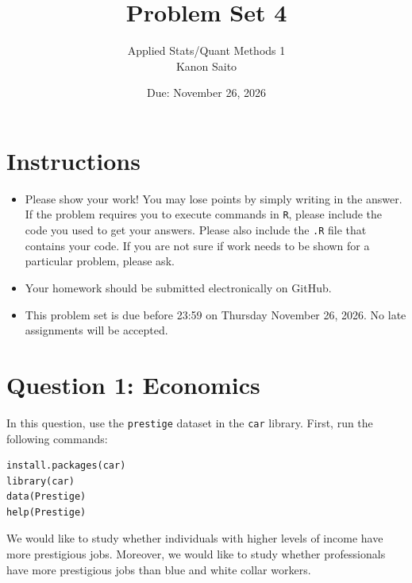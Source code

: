 \documentclass[12pt,letterpaper]{article}
\title{Problem Set 4}
\date{Due: November 26, 2026}
\author{
	Applied Stats/Quant Methods 1\\
	Kanon Saito
}
\begin{document}
	\maketitle
	\section*{Instructions}
	\begin{itemize}
		\item Please show your work! You may lose points by simply writing in the answer. If the problem requires you to execute commands in \texttt{R}, please include the code you used to get your answers. Please also include the \texttt{.R} file that contains your code. If you are not sure if work needs to be shown for a particular problem, please ask.
		\item Your homework should be submitted electronically on GitHub.
		\item This problem set is due before 23:59 on Thursday November 26, 2026. No late assignments will be accepted.
	\end{itemize}



	\vspace{.5cm}
\section*{Question 1: Economics}
\vspace{.25cm}
\noindent 	
In this question, use the \texttt{prestige} dataset in the \texttt{car} library. First, run the following commands:

\begin{verbatim}
install.packages(car)
library(car)
data(Prestige)
help(Prestige)
\end{verbatim} 

\noindent We would like to study whether individuals with higher levels of income have more prestigious jobs. Moreover, we would like to study whether professionals have more prestigious jobs than blue and white collar workers.
\end{document}
